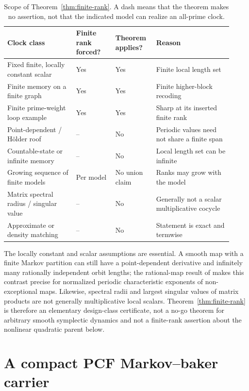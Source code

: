 \documentclass[11pt]{article}
\theoremstyle{definition}
\theoremstyle{remark}
\begin{document}
\begin{table}[t]
\centering
\footnotesize
\caption{Scope of Theorem~\ref{thm:finite-rank}.  A dash means that the
theorem makes no assertion, not that the indicated model can realize an
all-prime clock.}
\label{tab:scope}
\begin{tabular}{@{}p{0.29\linewidth}p{0.16\linewidth}p{0.16\linewidth}p{0.31\linewidth}@{}}
\toprule
Clock class & \centering Finite rank forced? & \centering Theorem applies? & Reason \\
\midrule
Fixed finite, locally constant scalar & Yes & Yes & Finite local length set \\
Finite memory on a finite graph & Yes & Yes & Finite higher-block recoding \\
Finite prime-weight loop example & Yes & Yes & Sharp at its inserted finite rank \\
Point-dependent / H\"older roof & -- & No & Periodic values need not share a finite span \\
Countable-state or infinite memory & -- & No & Local length set can be infinite \\
Growing sequence of finite models & Per model & No union claim & Ranks may grow with the model \\
Matrix spectral radius / singular value & -- & No & Generally not a scalar multiplicative cocycle \\
Approximate or density matching & -- & No & Statement is exact and termwise \\
\bottomrule
\end{tabular}
\end{table}

The locally constant and scalar assumptions are essential.  A smooth map with
a finite Markov partition can still have a point-dependent derivative and
infinitely many rationally independent orbit lengths; the rational-map result
of \citet{ji2026space} makes this contrast precise for normalized periodic
characteristic exponents of non-exceptional maps.  Likewise, spectral radii
and largest singular values of matrix products are not generally
multiplicative local scalars.  Theorem~\ref{thm:finite-rank} is therefore an
elementary design-class certificate, not a no-go theorem for arbitrary smooth
symplectic dynamics and not a finite-rank assertion about the nonlinear
quadratic parent below.

\section{A compact PCF Markov--baker carrier}
\label{sec:carrier}
\end{document}
